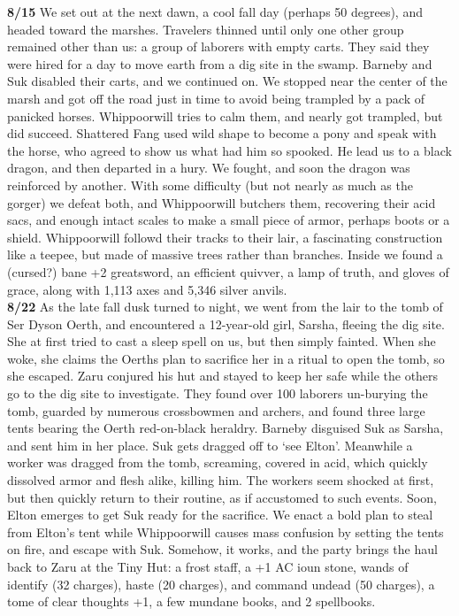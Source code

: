 \documentclass[letterpaper]{article}
\begin{document}
\noindent \textbf{8/15} We set out at the next dawn, a cool fall day (perhaps 50 degrees), and headed toward the marshes.  Travelers thinned until only one other group remained other than us: a group of laborers with empty carts.  They said they were hired for a day to move earth from a dig site in the swamp.  Barneby and Suk disabled their carts, and we continued on.  We stopped near the center of the marsh and got off the road just in time to avoid being trampled by a pack of panicked horses.  Whippoorwill tries to calm them, and nearly got trampled, but did succeed.  Shattered Fang used wild shape to become a pony and speak with the horse, who agreed to show us what had him so spooked.  He lead us to a black dragon, and then departed in a hury.  We fought, and soon the dragon was reinforced by another.  With some difficulty (but not nearly as much as the gorger) we defeat both, and Whippoorwill butchers them, recovering their acid sacs, and enough intact scales to make a small piece of armor, perhaps boots or a shield.  Whippoorwill followd their tracks to their lair, a fascinating construction like a teepee, but made of massive trees rather than branches.  Inside we found a (cursed?) bane +2 greatsword, an efficient quivver, a lamp of truth, and gloves of grace, along with 1,113 axes and 5,346 silver anvils.\\

\noindent \textbf{8/22} As the late fall dusk turned to night, we went from the lair to the tomb of Ser Dyson Oerth, and encountered a 12-year-old girl, Sarsha, fleeing the dig site. She at first tried to cast a sleep spell on us, but then simply fainted. When she woke, she claims the Oerths plan to sacrifice her in a ritual to open the tomb, so she escaped.  Zaru conjured his hut and stayed to keep her safe while the others go to the dig site to investigate. They found over 100 laborers un-burying the tomb, guarded by numerous crossbowmen and archers, and found three large tents bearing the Oerth red-on-black heraldry.  Barneby disguised Suk as Sarsha, and sent him in her place.  Suk gets dragged off to `see Elton'.  Meanwhile a worker was dragged from the tomb, screaming, covered in acid, which quickly dissolved armor and flesh alike, killing him.  The workers seem shocked at first, but then quickly return to their routine, as if accustomed to such events.  Soon, Elton emerges to get Suk ready for the sacrifice.  We enact a bold plan to steal from Elton's tent while Whippoorwill causes mass confusion by setting the tents on fire, and escape with Suk.  Somehow, it works, and the party brings the haul back to Zaru at the Tiny Hut: a frost staff, a +1 AC ioun stone, wands of identify (32 charges), haste (20 charges), and command undead (50 charges), a tome of clear thoughts +1, a few mundane books, and 2 spellbooks.\\
\end{document}
